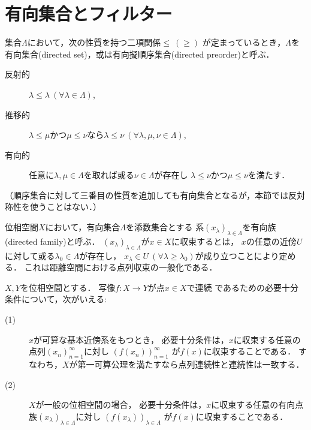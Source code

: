 \section{有向集合とフィルター}
	\begin{screen}
		\begin{dfn}[有向集合]
			集合$\Lambda$において，次の性質を持つ二項関係$\leq\ (\geq)$\footnotemark
			が定まっているとき，$\Lambda$を有向集合(directed set)，或は有向擬順序集合(directed preorder)と呼ぶ．
			\begin{description}
				\item[反射的] $\lambda \leq \lambda\ (\forall \lambda \in \Lambda)$,
				\item[推移的] $\lambda \leq \mu$かつ$\mu \leq \nu$なら$\lambda \leq \nu\ (\forall \lambda,\mu,\nu \in \Lambda)$,
				\item[有向的] 任意に$\lambda,\mu \in \Lambda$を取れば或る$\nu \in \Lambda$が存在し
					$\lambda \leq \nu$かつ$\mu \leq \nu$を満たす．
			\end{description}
			（順序集合に対して三番目の性質を追加しても有向集合となるが，本節では反対称性を使うことはない．）
		\end{dfn}
	\end{screen}
	\footnotetext{
		$\lambda,\mu \in \Lambda$について
		$\lambda \leq \mu \Leftrightarrow \mu \geq \lambda$．
	}
	\begin{screen}
		\begin{dfn}[有向族による収束の記述]
			位相空間$X$において，有向集合$\Lambda$を添数集合とする
			系$(x_\lambda)_{\lambda \in \Lambda}$を有向族(directed family)と呼ぶ．
			$(x_\lambda)_{\lambda \in \Lambda}$が$x \in X$に収束するとは，
			$x$の任意の近傍$U$に対して或る$\lambda_0 \in \Lambda$が存在し，
			$x_\lambda \in U\ (\forall \lambda \geq \lambda_0)$が成り立つことにより定める．
			これは距離空間における点列収束の一般化である．
		\end{dfn}
	\end{screen}
	
	\begin{screen}
		\begin{thm}[有向点族による連続性の特徴づけ]
			$X,Y$を位相空間とする．
			写像$f:X \longrightarrow Y$が点$x \in X$で連続
			であるための必要十分条件について，次がいえる:
			\begin{description}
				\item[(1)] $x$が可算な基本近傍系をもつとき，
					必要十分条件は，$x$に収束する任意の点列$(x_n)_{n=1}^{\infty}$に対し
					$\left( f(x_n) \right)_{n=1}^\infty$
					が$f(x)$に収束することである．
					すなわち，$X$が第一可算公理を満たすなら点列連続性と連続性は一致する．
				\item[(2)] $X$が一般の位相空間の場合，
					必要十分条件は，$x$に収束する任意の有向点族$(x_\lambda)_{\lambda \in \Lambda}$に対し
					$\left( f(x_\lambda) \right)_{\lambda \in \Lambda}$
					が$f(x)$に収束することである．
			\end{description}
		\end{thm}
	\end{screen}
	
